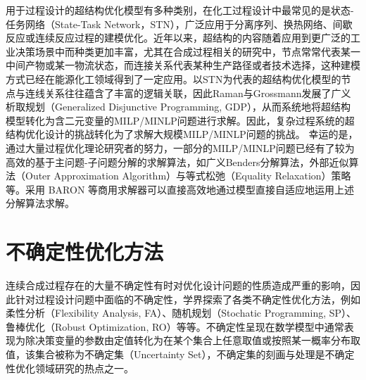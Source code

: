 用于过程设计的超结构优化模型有多种类别，在化工过程设计中最常见的是状态-任务网络（State-Task Network，STN），广泛应用于分离序列、换热网络、间歇反应或连续反应过程的建模优化\cite{kondili1993,yeoman1999}。近年以来，超结构的内容随着应用到更广泛的工业决策场景中而种类更加丰富，尤其在合成过程相关的研究中，节点常常代表某一中间产物或某一物流状态，而连接关系代表某种生产路径或者技术选择，这种建模方式已经在能源化工领域得到了一定应用\cite{manuelrestrepo2021}。以STN为代表的超结构优化模型的节点与连线关系往往蕴含了丰富的逻辑关联，因此Raman与Grossmann发展了广义析取规划（Generalized Disjunctive Programming, GDP）\cite{raman1994}，从而系统地将超结构模型转化为含二元变量的MILP/MINLP问题进行求解。因此，复杂过程系统的超结构优化设计的挑战转化为了求解大规模MILP/MINLP问题的挑战\cite{turkey1996}。
幸运的是，通过大量过程优化理论研究者的努力，一部分的MILP/MINLP问题已经有了较为高效的基于主问题-子问题分解的求解算法，如广义Benders分解算法\cite{geoffrion1972}，外部近似算法（Outer Approximation Algorithm）与等式松弛（Equality Relaxation）策略\cite{duran1986,kocis1988}等。采用 {BARON} 等商用求解器\cite{kilinc2018}可以直接高效地通过模型直接自适应地运用上述分解算法求解。

\section{不确定性优化方法}

连续合成过程存在的大量不确定性有时对优化设计问题的性质造成严重的影响，因此针对过程设计问题中面临的不确定性，学界探索了各类不确定性优化方法，例如柔性分析（Flexibility Analysis, FA）、随机规划（Stochatic Programming, SP）、鲁棒优化（Robust Optimization, RO）等等。不确定性呈现在数学模型中通常表现为除决策变量的参数由定值转化为在某个集合上任意取值或按照某一概率分布取值，该集合被称为不确定集（Uncertainty Set），不确定集的刻画与处理是不确定性优化领域研究的热点之一。

